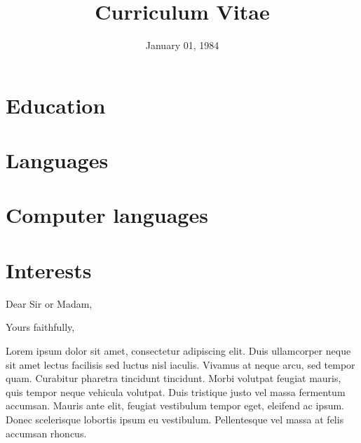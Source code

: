 \documentclass[11pt,a4paper,sans]{moderncv}        %
\title{Curriculum Vitae}                               %
\begin{document}
\makecvtitle

\section{Education}

\section{Languages}

\section{Computer languages}

\section{Interests}




\clearpage
\date{January 01, 1984}
\opening{Dear Sir or Madam,}
\closing{Yours faithfully,}
\makelettertitle

Lorem ipsum dolor sit amet, consectetur adipiscing elit. Duis ullamcorper neque sit amet lectus facilisis sed luctus nisl iaculis. Vivamus at neque arcu, sed tempor quam. Curabitur pharetra tincidunt tincidunt. Morbi volutpat feugiat mauris, quis tempor neque vehicula volutpat. Duis tristique justo vel massa fermentum accumsan. Mauris ante elit, feugiat vestibulum tempor eget, eleifend ac ipsum. Donec scelerisque lobortis ipsum eu vestibulum. Pellentesque vel massa at felis accumsan rhoncus.
\end{document}
